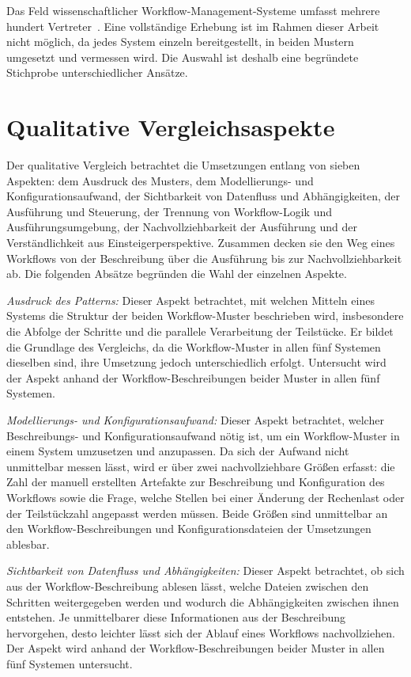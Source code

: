 Das Feld wissenschaftlicher Workflow-Management-Systeme umfasst
mehrere hundert Vertreter~\cite{suter2026terminology,wcisystems}.
Eine vollständige Erhebung ist im Rahmen dieser Arbeit nicht
möglich, da jedes System einzeln bereitgestellt, in beiden Mustern
umgesetzt und vermessen wird. Die Auswahl ist deshalb eine
begründete Stichprobe unterschiedlicher Ansätze.

\section{Qualitative Vergleichsaspekte}
\label{sec:methodik:qualitativ}
Der qualitative Vergleich betrachtet die Umsetzungen entlang von
sieben Aspekten: dem Ausdruck des Musters, dem Modellierungs- und
Konfigurationsaufwand, der Sichtbarkeit von Datenfluss und Abhängigkeiten, der
Ausführung und Steuerung, der Trennung von Workflow-Logik und
Ausführungsumgebung, der Nachvollziehbarkeit der Ausführung 
und der Verständlichkeit aus Einsteigerperspektive. Zusammen decken sie den
Weg eines Workflows von der Beschreibung über die Ausführung bis
zur Nachvollziehbarkeit ab. Die folgenden Absätze
begründen die Wahl der einzelnen Aspekte.

\emph{Ausdruck des Patterns:} Dieser Aspekt betrachtet, mit welchen Mitteln eines Systems die Struktur der beiden Workflow-Muster beschrieben wird, insbesondere die Abfolge der Schritte und die parallele Verarbeitung der Teilstücke. Er bildet die Grundlage des Vergleichs, da die Workflow-Muster in allen fünf Systemen dieselben sind, ihre Umsetzung jedoch unterschiedlich erfolgt. Untersucht wird der Aspekt anhand der Workflow-Beschreibungen beider Muster in allen fünf Systemen.

\emph{Modellierungs- und Konfigurationsaufwand:} Dieser Aspekt betrachtet, welcher Beschreibungs- und Konfigurationsaufwand nötig ist, um ein Workflow-Muster in einem System umzusetzen und anzupassen. Da sich der Aufwand nicht unmittelbar messen lässt, wird er über zwei nachvollziehbare Größen erfasst: die Zahl der manuell erstellten Artefakte zur Beschreibung und Konfiguration des
Workflows sowie die Frage, welche Stellen bei einer Änderung der Rechenlast oder der Teilstückzahl angepasst werden müssen. Beide Größen sind unmittelbar an den Workflow-Beschreibungen und Konfigurationsdateien der Umsetzungen ablesbar.

\emph{Sichtbarkeit von Datenfluss und Abhängigkeiten:} Dieser Aspekt betrachtet, ob sich aus der Workflow-Beschreibung ablesen lässt, welche Dateien zwischen den Schritten weitergegeben werden und wodurch die Abhängigkeiten zwischen ihnen entstehen. Je unmittelbarer diese Informationen aus der Beschreibung hervorgehen, desto leichter lässt sich der Ablauf eines Workflows nachvollziehen. Der
Aspekt wird anhand der Workflow-Beschreibungen beider Muster in
allen fünf Systemen untersucht.

